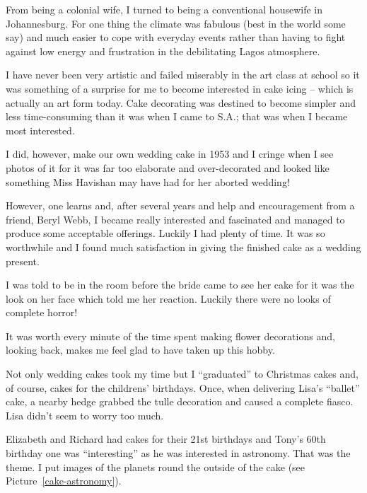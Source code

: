 From being a colonial wife, I turned to being a conventional housewife
in Johannesburg. For one thing the climate was fabulous (best in the
world some say) and much easier to cope with everyday events rather
than having to fight against low energy and frustration in the
debilitating Lagos atmosphere.

I have never been very artistic and failed miserably in the art class
at school so it was something of a surprise for me to become
interested in cake icing -- which is actually an art form today. Cake
decorating was destined to become simpler and less time-consuming than
it was when I came to S.A.; that was when I became most interested.

I did, however, make our own wedding cake in 1953 and I cringe when I
see photos of it for it was far too elaborate and over-decorated and
looked like something Miss Havishan may have had for her aborted
wedding!

However, one learns and, after several years and help and
encouragement from a friend, Beryl Webb, I became really interested
and fascinated and managed to produce some acceptable
offerings. Luckily I had plenty of time. It was so worthwhile and I
found much satisfaction in giving the finished cake as a wedding
present.

I was told to be in the room before the bride came to see her cake for
it was the look on her face which told me her reaction. Luckily there
were no looks of complete horror!

It was worth every minute of the time spent making flower decorations
and, looking back, makes me feel glad to have taken up this hobby.

Not only wedding cakes took my time but I ``graduated'' to Christmas
cakes and, of course, cakes for the childrens' birthdays. Once, when
delivering Lisa's ``ballet'' cake, a nearby hedge grabbed the tulle
decoration and caused a complete fiasco. Lisa didn't seem to worry too
much.

Elizabeth and Richard had cakes for their 21st birthdays and Tony's
60th birthday one was ``interesting'' as he was interested in
astronomy. That was the theme. I put images of the planets round the
outside of the cake (see Picture~\ref{cake-astronomy}).


